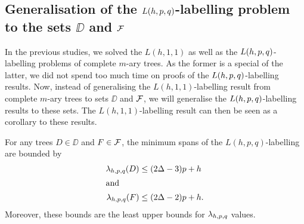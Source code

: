 \subsection{Generalisation of the $L(h,p,q)$-labelling problem to the sets $\DD$ and ${\cal F}$}
\label{sec:general results}

In the previous studies, we solved the $L(h,1,1)$ as well as the $L(h,p,q)$-labelling problems of complete $m$-ary trees. As the former is a special of the latter, we did not spend too much time on proofs of the $L(h,p,q)$-labelling results. Now, instead of generalising the $L(h,1,1)$-labelling result from complete $m$-ary trees to sets $\DD$ and ${\cal F}$, we will generalise the $L(h,p,q)$-labelling results to these sets. The $L(h,1,1)$-labelling result can then be seen as a corollary to these results. 
\begin{corollary}
\label{cor:ub}
For any trees $D \in \DD$ and $F \in {\cal F}$, the minimum spans of the $L(h,p,q)$-labelling are bounded by
\begin{align}
\label{upper1}
\lambda_{h,p,q}(D) &\le (2\Delta -3)p+ h\\
\intertext{and}
\label{upper2}
\lambda_{h,p,q}(F) &\le (2\Delta-2)p + h. 
\end{align} 
Moreover, these bounds are the least upper bounds for $\lambda_{h,p,q}$ values. 
\end{corollary}

